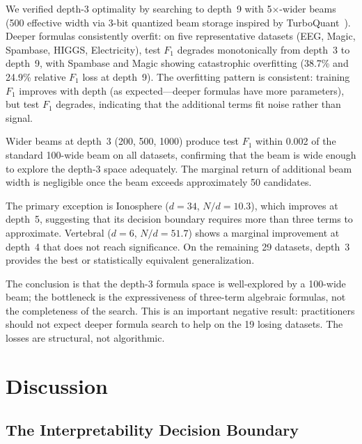 \documentclass[journal]{IEEEtran}
\begin{document}
We verified depth-3 optimality by searching to depth~9 with
5$\times$-wider beams (500 effective width via 3-bit quantized beam
storage inspired by TurboQuant~\cite{zandieh2026turboquant}).
Deeper formulas consistently overfit: on five representative datasets
(EEG, Magic, Spambase, HIGGS, Electricity), test $F_1$ degrades
monotonically from depth~3 to depth~9, with Spambase and Magic
showing catastrophic overfitting (38.7\% and 24.9\% relative $F_1$
loss at depth~9).  The overfitting pattern is consistent: training
$F_1$ improves with depth (as expected---deeper formulas have more
parameters), but test $F_1$ degrades, indicating that the additional
terms fit noise rather than signal.

Wider beams at depth~3 (200, 500, 1000) produce test $F_1$ within
0.002 of the standard 100-wide beam on all datasets, confirming
that the beam is wide enough to explore the depth-3 space
adequately.  The marginal return of additional beam width is
negligible once the beam exceeds approximately 50 candidates.

The primary exception is Ionosphere ($d = 34$, $N/d = 10.3$), which
improves at depth~5, suggesting that its decision boundary requires
more than three terms to approximate.  Vertebral ($d = 6$,
$N/d = 51.7$) shows a marginal improvement at depth~4 that does
not reach significance.  On the remaining 29 datasets, depth~3
provides the best or statistically equivalent generalization.

The conclusion is that the depth-3 formula space is well-explored
by a 100-wide beam; the bottleneck is the expressiveness of
three-term algebraic formulas, not the completeness of the search.
This is an important negative result: practitioners should not
expect deeper formula search to help on the 19 losing datasets.
The losses are structural, not algorithmic.

\section{Discussion}

\subsection{The Interpretability Decision Boundary}
\label{sec:boundary}
\end{document}
